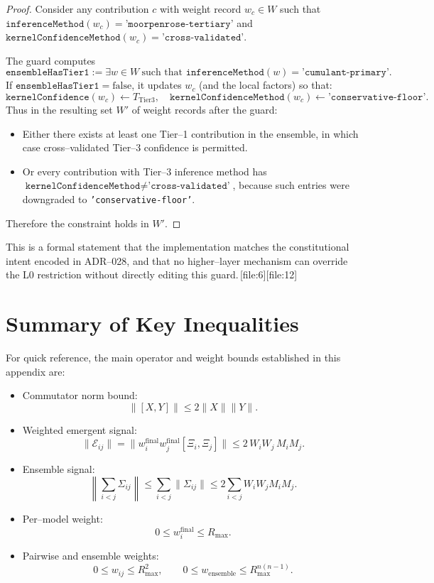 \documentclass[11pt]{article}
\begin{document}
\begin{proof}
Consider any contribution \(c\) with weight record \(w_c \in W\) such that
\(\texttt{inferenceMethod}(w_c) = \texttt{'moorpenrose-tertiary'}\) and
\(\texttt{kernelConfidenceMethod}(w_c) = \texttt{'cross-validated'}\).

The guard computes
\[
  \texttt{ensembleHasTier1}
  := \exists w \in W\ \text{such that } \texttt{inferenceMethod}(w)
      = \texttt{'cumulant-primary'}.
\]
If \(\texttt{ensembleHasTier1} = \mathrm{false}\), it updates \(w_c\) (and the
local factors) so that:
\[
  \texttt{kernelConfidence}(w_c) \gets T_{\mathrm{Tier3}},
  \quad
  \texttt{kernelConfidenceMethod}(w_c) \gets \texttt{'conservative-floor'}.
\]
Thus in the resulting set \(W'\) of weight records after the guard:

\begin{itemize}[leftmargin=*]
  \item Either there exists at least one Tier--1 contribution in the ensemble,
  in which case cross--validated Tier--3 confidence is permitted.
  \item Or every contribution with Tier--3 inference method has
  \(\texttt{kernelConfidenceMethod} \ne \texttt{'cross-validated'}\), because
  such entries were downgraded to \texttt{'conservative-floor'}.
\end{itemize}

Therefore the constraint holds in \(W'\).
\end{proof}

This is a formal statement that the implementation matches the constitutional
intent encoded in ADR--028, and that no higher--layer mechanism can override
the L0 restriction without directly editing this guard.\,[file:6][file:12]

\section{Summary of Key Inequalities}

For quick reference, the main operator and weight bounds established in this
appendix are:

\begin{itemize}[leftmargin=*]
  \item Commutator norm bound:
  \[
    \|[X,Y]\| \le 2 \|X\|\|Y\|.
  \]
  \item Weighted emergent signal:
  \[
    \|\mathcal{E}_{ij}\|
    = \|w_i^{\mathrm{final}} w_j^{\mathrm{final}} [\Xi_i,\Xi_j]\|
    \le 2\,W_i W_j\,M_i M_j.
  \]
  \item Ensemble signal:
  \[
    \left\|\sum_{i<j} \Sigma_{ij}\right\|
    \le \sum_{i<j} \|\Sigma_{ij}\|
    \le 2\sum_{i<j} W_i W_j M_i M_j.
  \]
  \item Per--model weight:
  \[
    0 \le w_i^{\mathrm{final}} \le R_{\max}.
  \]
  \item Pairwise and ensemble weights:
  \[
    0 \le w_{ij} \le R_{\max}^2, \qquad
    0 \le w_{\mathrm{ensemble}} \le R_{\max}^{n(n-1)}.
  \]
\end{itemize}
\end{document}
